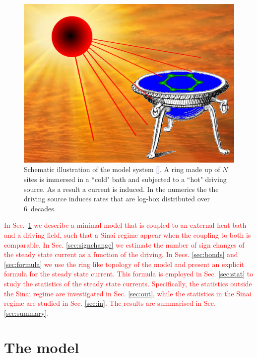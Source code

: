 \documentclass[aps,pre,floats,floatfix,twocolumn]{revtex4}
\newcommand{\rmrk}[1]{\textcolor{red}{#1}}
\renewcommand{\cite}[1]{\textcolor{blue}{[\onlinecite{#1}}]} %
\begin{document}
\begin{figure}
\centering
\includegraphics[width=\hsize]{SunBath}
\caption{
%
Schematic illustration of the model system \cite{imgs}.
%
A ring made up of $N$ sites is immersed in a ``cold" bath 
and subjected to a ``hot" driving source. 
As a result a current is induced.  
%
In the numerics the the driving source induces 
rates that are log-box distributed over 6~decades. 
} 
\label{f0}
\end{figure}


\rmrk{In Sec.~\ref{sec:model} we describe a minimal model that is coupled to an external heat bath and a driving field, such that a Sinai regime appear when the coupling to both is comparable. In Sec. \ref{sec:signchange} we estimate the number of sign changes of the steady state current as a function of the driving. In Secs. \ref{sec:bonds} and \ref{sec:formula} we use the ring like topology of the model and present an explicit formula for the steady state current. This formula is employed in Sec. \ref{sec:stat} to study the statistics of the steady state currents. Specifically, the statistics outside the Sinai regime are investigated in Sec. \ref{sec:out}, while the statistics in the Sinai regime are studied in Sec. \ref{sec:in}. The results are summarised in Sec. \ref{sec:summary}.}


\section{The model}
\label{sec:model}
\end{document}
